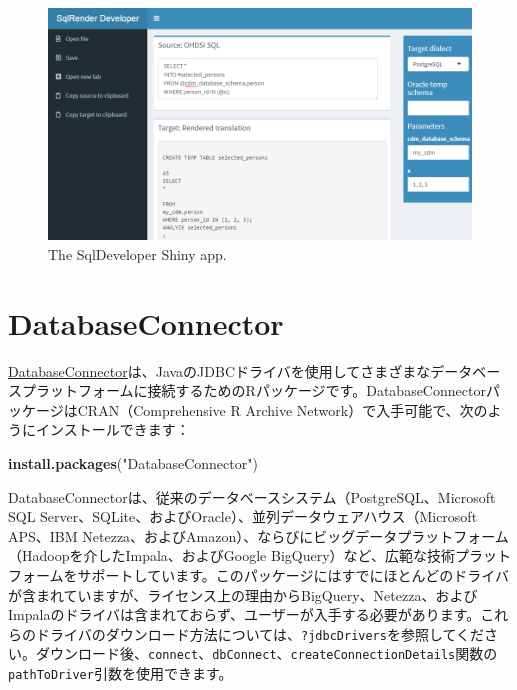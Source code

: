\documentclass[
  11pt]{book}
\newenvironment{Shaded}{\begin{snugshade}}{\end{snugshade}}
\newcommand{\FunctionTok}[1]{\textcolor[rgb]{0.13,0.29,0.53}{\textbf{#1}}}
\newcommand{\NormalTok}[1]{#1}
\newcommand{\StringTok}[1]{\textcolor[rgb]{0.31,0.60,0.02}{#1}}
\theoremstyle{definition}
\theoremstyle{definition}
\theoremstyle{definition}
\theoremstyle{definition}
\theoremstyle{remark}
\begin{document}
\begin{figure}

{\centering \includegraphics[width=1\linewidth]{images/SqlAndR/sqlDeveloper} 

}

\caption{The SqlDeveloper Shiny app.}\label{fig:sqlDeveloper}
\end{figure}

\section{DatabaseConnector}\label{DatabaseConnector}

\href{https://ohdsi.github.io/DatabaseConnector/}{DatabaseConnector}は、JavaのJDBCドライバを使用してさまざまなデータベースプラットフォームに接続するためのRパッケージです。DatabaseConnectorパッケージはCRAN（Comprehensive R Archive Network）で入手可能で、次のようにインストールできます：

\begin{Shaded}
\begin{Highlighting}[]
\FunctionTok{install.packages}\NormalTok{(}\StringTok{"DatabaseConnector"}\NormalTok{)}
\end{Highlighting}
\end{Shaded}

DatabaseConnectorは、従来のデータベースシステム（PostgreSQL、Microsoft SQL Server、SQLite、およびOracle）、並列データウェアハウス（Microsoft APS、IBM Netezza、およびAmazon）、ならびにビッグデータプラットフォーム（Hadoopを介したImpala、およびGoogle BigQuery）など、広範な技術プラットフォームをサポートしています。このパッケージにはすでにほとんどのドライバが含まれていますが、ライセンス上の理由からBigQuery、Netezza、およびImpalaのドライバは含まれておらず、ユーザーが入手する必要があります。これらのドライバのダウンロード方法については、\texttt{?jdbcDrivers}を参照してください。ダウンロード後、\texttt{connect}、\texttt{dbConnect}、\texttt{createConnectionDetails}関数の\texttt{pathToDriver}引数を使用できます。
\end{document}
